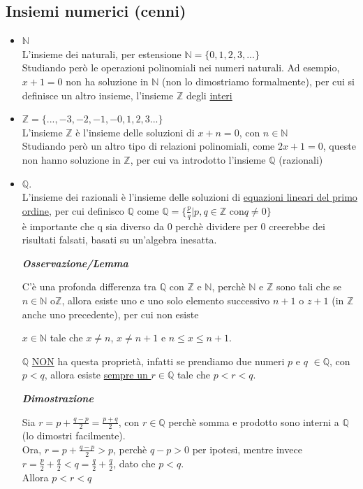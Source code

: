 \documentclass{article}
\theoremstyle{definition}
\newcommand{\N}{\mathbb{N}}
\begin{document}
\subsection{Insiemi numerici (cenni)}
\begin{itemize}
    \item $\mathbb{N}$
    \\L'insieme dei naturali, per estensione $\mathbb{N}=\{0,1,2,3,...\}$
    \\Studiando però le operazioni polinomiali nei numeri naturali. Ad esempio, $x+1=0$ non ha soluzione in $\mathbb{N}$ (non lo dimostriamo formalmente), per cui si definisce un altro insieme, l'insieme $\mathbb{Z}$ degli \underline{interi}
    \item $\mathbb{Z}=\{...,-3,-2,-1,-0,1,2,3...\}$
    \\ L'insieme $\mathbb{Z}$ è l'insieme delle soluzioni di $x+n=0$, con $n \in \N$
    \\Studiando però un altro tipo di relazioni polinomiali, come $2x +1 =0$, queste non hanno soluzione in $\mathbb{Z}$, per cui va introdotto l'insieme $\mathbb{Q}$ (razionali)
    \item $\mathbb{Q}$.
    \\ L'insieme dei razionali è l'insieme delle soluzioni di \underline{equazioni lineari del primo ordine}, per cui definisco $\mathbb{Q}$ come $\mathbb{Q}=\{\frac{p}{q}|p,q \in \mathbb{Z} \,\, \mbox{con} q \neq 0\}$
    \\ è importante che q sia diverso da 0 perchè dividere per 0 creerebbe dei risultati falsati, basati su un'algebra inesatta.

    \begin{center}
        \textbf{\textit{Osservazione/Lemma}}
    \end{center}
    C'è una profonda differenza tra $\mathbb{Q}$ con $\mathbb{Z}$ e $\mathbb{N}$, perchè $\mathbb{N}$ e $\mathbb{Z}$ sono tali che se $n \in \mathbb{N}$ o$ \mathbb{Z}$, allora esiste uno e uno solo elemento successivo $n+1$ o $z +1 $ (in $\mathbb{Z}$ anche uno precedente), per cui non esiste
    \begin{center}
        $x \in \mathbb{N}$ tale che $x \neq n$, $x \neq n+1$ e $n \leqslant x \leqslant n+1$.
    \end{center}
    $\mathbb{Q}$ \underline{NON} ha questa proprietà, infatti se prendiamo due numeri $p$ e $q$ $\in \mathbb{Q}$, con $p < q$, allora esiste \underline{sempre un $r \in \mathbb{Q}$} tale che $p < r <q$.
    \begin{center}
        \textbf{\textit{Dimostrazione}}
    \end{center}
Sia $r=p+\frac{q-p}{2}=\frac{p+q}{2}$, con $r \in \mathbb{Q}$ perchè somma e prodotto sono interni a $\mathbb{Q}$ (lo dimostri facilmente).
\\
Ora, $r=p+\frac{q-p}{2}>p$, perchè $q-p> 0$ per ipotesi, mentre invece $r=\frac{p}{2}+\frac{q}{2} < q=\frac{q}{2}+\frac{q}{2}$, dato che $p < q$.
\\
Allora $p < r < q$
    

\end{itemize}
\end{document}
